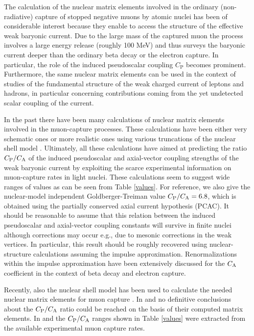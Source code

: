 \begin{multicols}{2}

The calculation of the nuclear matrix elements involved in the
ordinary (non-radiative) capture of stopped negative muons by atomic nuclei has
been of considerable interest because they enable to access the
structure of the effective weak baryonic current. Due to the large mass
of the captured muon the process involves a large energy release
(roughly 100 MeV) and thus surveys the baryonic current deeper than the
ordinary beta decay or the electron capture.
In particular, the role of the induced pseudoscalar coupling $C_{\mathrm P}$
becomes prominent. Furthermore, the same nuclear matrix elements can be
used in the context of studies of the fundamental structure of the weak
charged current of leptons and hadrons, in particular concerning
contributions coming from the yet undetected scalar coupling of the current.

In the past there have been many calculations of nuclear matrix
elements involved in the muon-capture processes. These calculations
have been either very schematic ones \cite{mor,GIL65,PAR78} or more
realistic ones using various truncations of the nuclear shell model
\cite{GIL65,PAR78,ERI64}. Ultimately, all these
calculations have aimed at predicting the ratio $C_{\rm P}/C_{\rm A}$
of the induced pseudoscalar and axial-vector
coupling strengths of the weak baryonic current by exploiting the
scarce experimental information
on muon-capture rates in light nuclei.
These calculations seem to suggest wide ranges of values as can be seen from
Table \ref{values}.
For reference, we also give the nuclear-model independent Goldberger-Treiman
value $C_{\rm P}/C_{\rm A}=6.8$,
which is obtained using the partially conserved axial current hypothesis
(PCAC). It should be
reasonable to assume that this relation between the induced pseudoscalar
and axial-vector coupling constants will survive in finite nuclei
although corrections may occur e.g., due to mesonic corrections in the weak
vertices. In particular, this result should be roughly recovered using
nuclear-structure calculations assuming the impulse approximation.
Renormalizations within the impulse approximation have been extensively
discussed for the $C_{\rm A}$ coefficient in the context of beta decay
and electron capture.

Recently, also the nuclear shell model has been used to
calculate the needed nuclear matrix elements for muon capture
\cite{GMI90,KUZ94,JOH96,MOF97,sii}.
In \cite{GMI90} and \cite{KUZ94} no definitive conclusions about
the $C_{\rm P}/C_{\rm A}$ ratio could be reached
on the basis of their computed matrix elements.
In \cite{JOH96} and \cite{sii} the $C_{\rm P}/C_{\rm A}$ ranges shown in
Table \ref{values}
were extracted from the available experimental muon capture rates.


\end{multicols}
